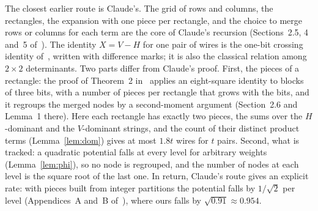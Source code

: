 \documentclass[11pt]{article}
\begin{document}
The closest earlier route is Claude's. The grid of rows and columns, the rectangles, the expansion with one piece per rectangle, and the choice to merge rows or columns for each term are the core of Claude's recursion (Sections~2.5, 4 and~5 of~\cite{Cla26}). The identity $X=V-H$ for one pair of wires is the one-bit crossing identity of~\cite[Appendix~H]{Cla26}, written with difference marks; it is also the classical relation among $2\times2$ determinants. Two parts differ from Claude's proof. First, the pieces of a rectangle: the proof of Theorem~2 in~\cite{Cla26} applies an eight-square identity to blocks of three bits, with a number of pieces per rectangle that grows with the bits, and it regroups the merged nodes by a second-moment argument (Section~2.6 and Lemma~1 there). Here each rectangle has exactly two pieces, the sums over the $H$-dominant and the $V$-dominant strings, and the count of their distinct product terms (Lemma~\ref{lem:dom}) gives at most $1.8t$ wires for $t$ pairs. Second, what is tracked: a quadratic potential falls at every level for arbitrary weights (Lemma~\ref{lem:phi}), so no node is regrouped, and the number of nodes at each level is the square root of the last one. In return, Claude's route gives an explicit rate: with pieces built from integer partitions the potential falls by $1/\sqrt2$ per level (Appendices~A and~B of~\cite{Cla26}), where ours falls by $\sqrt{0.91}\approx0.954$.
\end{document}
